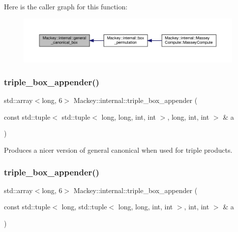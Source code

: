Here is the caller graph for this function\+:\nopagebreak
\begin{figure}[H]
\begin{center}
\leavevmode
\includegraphics[width=350pt]{namespaceMackey_1_1internal_a780adcafc5fe040d6340557f88f052f2_icgraph}
\end{center}
\end{figure}
\mbox{\label{namespaceMackey_1_1internal_a3ad5c7d43d4f8e63a3b6a8ec55f85dfa}} 
\subsubsection{\texorpdfstring{triple\+\_\+box\+\_\+appender()}{triple\_box\_appender()}\hspace{0.1cm}{\footnotesize\ttfamily [1/2]}}
{\footnotesize\ttfamily std\+::array$<$long, 6$>$ Mackey\+::internal\+::triple\+\_\+box\+\_\+appender (\begin{DoxyParamCaption}\item[{const std\+::tuple$<$ std\+::tuple$<$ long, long, int, int $>$, long, int, int $>$ \&}]{a }\end{DoxyParamCaption})}



Produces a nicer version of general canonical when used for triple products. 

\mbox{\label{namespaceMackey_1_1internal_ac9c5122d0b7488b13f15bb6a7e03a9f8}} 
\subsubsection{\texorpdfstring{triple\+\_\+box\+\_\+appender()}{triple\_box\_appender()}\hspace{0.1cm}{\footnotesize\ttfamily [2/2]}}
{\footnotesize\ttfamily std\+::array$<$long, 6$>$ Mackey\+::internal\+::triple\+\_\+box\+\_\+appender (\begin{DoxyParamCaption}\item[{const std\+::tuple$<$ long, std\+::tuple$<$ long, long, int, int $>$, int, int $>$ \&}]{a }\end{DoxyParamCaption})}



